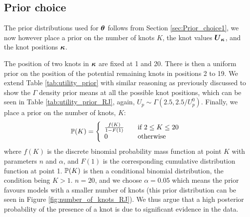 \subsection{Prior choice}
\label{sec:Prior_choice2}

The prior distributions used for \(\boldsymbol{\theta}\) follows from Section \ref{sec:Prior_choice1}, we now however place a
prior on the number of knots \(K\), the knot values \(\boldsymbol{U}_{\boldsymbol{\kappa}}\), and the knot positions \(\boldsymbol{\kappa}\).

The position of two knots in \(\boldsymbol{\kappa}\) are fixed at 1 and 20. There is then a uniform prior on the position of the
potential remaining knots in positions 2 to 19. We extend Table \ref{tab:utility_prior} with similar reasoning as
previously discussed to show the \(\Gamma\) density prior means at all the possible knot positions, which can be seen in
Table \ref{tab:utility_prior_RJ}, again, \(U_p \sim \Gamma(2.5, 2.5 / U^0_p)\). Finally, we place a prior on the number
of knots, \(K\):
\begin{align} 
\mathbb{P}(K) = \left \{
\begin{array}{ll}
\frac{f(K)}{1 - F(1)} \quad & \text{if } 2 \leq K \leq 20\\
0		                    & \text{otherwise}
\end{array} \right.
\end{align}
where \(f(K)\) is the discrete binomial probability mass function at point \(K\) with parameters \(n\) and \(\alpha\),
and \(F(1)\) is the corresponding cumulative distribution function at point 1. \(\mathbb{P}(K)\) is then a conditional
binomial distribution, the condition being \(K > 1\). \(n = 20\), and we choose \(\alpha = 0.05\) which means the prior
favours models with a smaller number of knots (this prior distribution can be seen in Figure
\ref{fig:number_of_knots_RJ}). We thus argue that a high posterior probability of the presence of a knot is due to
significant evidence in the data.
\begin{table}
\centering
{}
\caption{\label{tab:utility_prior_RJ} The means of the \(\Gamma\) prior density for the utility value at each
possible knot position}
\end{table}

